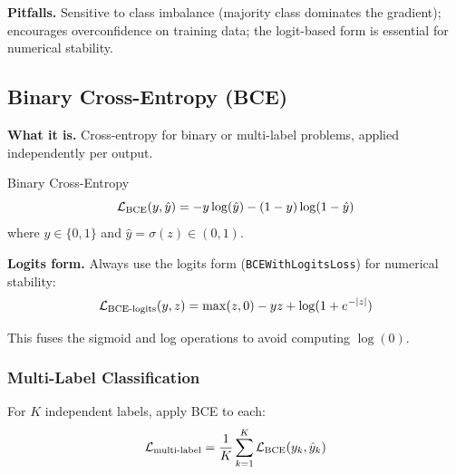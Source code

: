 \textbf{Pitfalls.} Sensitive to class imbalance (majority class dominates the gradient); encourages overconfidence on training data; the logit-based form is essential for numerical stability.

\subsection{Binary Cross-Entropy (BCE)}

\textbf{What it is.} Cross-entropy for binary or multi-label problems, applied independently per output.

\begin{mathresult}{Binary Cross-Entropy}
\begin{equation}
\mathcal{L}_{\text{BCE}}(y, \hat{y}) = -y \log(\hat{y}) - (1-y) \log(1-\hat{y})
\end{equation}
where $y \in \{0, 1\}$ and $\hat{y} = \sigma(z) \in (0, 1)$.
\end{mathresult}

\textbf{Logits form.} Always use the logits form (\texttt{BCEWithLogitsLoss}) for numerical stability:
\begin{equation}
\mathcal{L}_{\text{BCE-logits}}(y, z) = \max(z, 0) - yz + \log(1 + e^{-|z|})
\end{equation}

This fuses the sigmoid and log operations to avoid computing $\log(0)$.

\subsubsection{Multi-Label Classification}

For $K$ independent labels, apply BCE to each:
\begin{equation}
\mathcal{L}_{\text{multi-label}} = \frac{1}{K}\sum_{k=1}^{K} \mathcal{L}_{\text{BCE}}(y_k, \hat{y}_k)
\end{equation}

